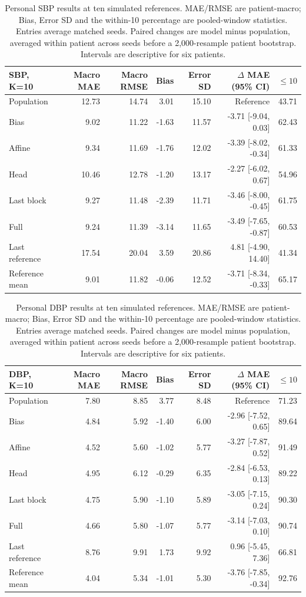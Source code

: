\documentclass[11pt]{article}
\begin{document}
\begin{table}[t]\centering\small
\begin{tabular}{lrrrrrr}\toprule
SBP, K=10 & Macro MAE & Macro RMSE & Bias & Error SD & $\Delta$ MAE (95\% CI) & $\leq 10$\\\midrule
Population & 12.73 & 14.74 & 3.01 & 15.10 & Reference & 43.71\\
Bias & 9.02 & 11.22 & -1.63 & 11.57 & -3.71 [-9.04, 0.03] & 62.43\\
Affine & 9.34 & 11.69 & -1.76 & 12.02 & -3.39 [-8.02, -0.34] & 61.33\\
Head & 10.46 & 12.78 & -1.20 & 13.17 & -2.27 [-6.02, 0.67] & 54.96\\
Last block & 9.27 & 11.48 & -2.39 & 11.71 & -3.46 [-8.00, -0.45] & 61.75\\
Full & 9.24 & 11.39 & -3.14 & 11.65 & -3.49 [-7.65, -0.87] & 60.53\\
Last reference & 17.54 & 20.04 & 3.59 & 20.86 & 4.81 [-4.90, 14.40] & 41.34\\
Reference mean & 9.01 & 11.82 & -0.06 & 12.52 & -3.71 [-8.34, -0.33] & 65.17\\
\bottomrule\end{tabular}
\caption{Personal SBP results at ten simulated references. MAE/RMSE are patient-macro; Bias, Error SD and the within-10 percentage are pooled-window statistics. Entries average matched seeds. Paired changes are model minus population, averaged within patient across seeds before a 2,000-resample patient bootstrap. Intervals are descriptive for six patients.}\end{table}

\begin{table}[t]\centering\small
\begin{tabular}{lrrrrrr}\toprule
DBP, K=10 & Macro MAE & Macro RMSE & Bias & Error SD & $\Delta$ MAE (95\% CI) & $\leq 10$\\\midrule
Population & 7.80 & 8.85 & 3.77 & 8.48 & Reference & 71.23\\
Bias & 4.84 & 5.92 & -1.40 & 6.00 & -2.96 [-7.52, 0.65] & 89.64\\
Affine & 4.52 & 5.60 & -1.02 & 5.77 & -3.27 [-7.87, 0.52] & 91.49\\
Head & 4.95 & 6.12 & -0.29 & 6.35 & -2.84 [-6.53, 0.13] & 89.22\\
Last block & 4.75 & 5.90 & -1.10 & 5.89 & -3.05 [-7.15, 0.24] & 90.30\\
Full & 4.66 & 5.80 & -1.07 & 5.77 & -3.14 [-7.03, 0.10] & 90.74\\
Last reference & 8.76 & 9.91 & 1.73 & 9.92 & 0.96 [-5.45, 7.36] & 66.81\\
Reference mean & 4.04 & 5.34 & -1.01 & 5.30 & -3.76 [-7.85, -0.34] & 92.76\\
\bottomrule\end{tabular}
\caption{Personal DBP results at ten simulated references. MAE/RMSE are patient-macro; Bias, Error SD and the within-10 percentage are pooled-window statistics. Entries average matched seeds. Paired changes are model minus population, averaged within patient across seeds before a 2,000-resample patient bootstrap. Intervals are descriptive for six patients.}\end{table}
\end{document}
